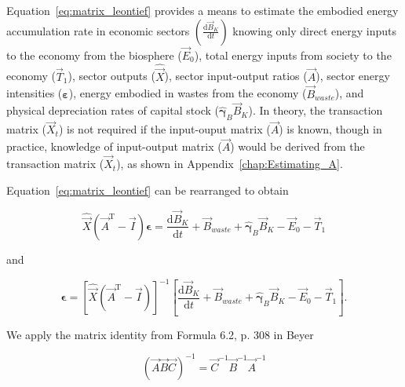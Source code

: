 Equation~\ref{eq:matrix_leontief} provides a means to 
estimate the embodied energy accumulation rate
in economic sectors $\left(\frac{\mathrm{d}\vec{B}_{K}}{\mathrm{d}t}\right)$ 
knowing only 
direct energy inputs to the economy from the biosphere ($\vec{E}_{0}$), 
total energy inputs from society to the economy ($\vec{T}_{1}$),
sector outputs ($\hat{\vec{X}}$), 
sector input-output ratios ($\vec{A}$), 
sector energy intensities ($\bm{\varepsilon}$), 
energy embodied in wastes from the economy ($\vec{B}_{waste}$),
and physical depreciation rates of capital stock ($\hat{\bm{\gamma}}_{B}\vec{B}_{K}$). 
In theory, the transaction matrix ($\vec{X}_{t}$) is not required 
if the input-ouput matrix ($\vec{A}$) is known, 
though in practice, 
knowledge of input-output matrix ($\vec{A}$) 
would be derived from the transaction matrix ($\vec{X}_{t}$),
as shown in Appendix~\ref{chap:Estimating_A}.



Equation~\ref{eq:matrix_leontief} can be rearranged to obtain

\begin{equation} \label{eq:epsilon_derivation_1}
	\hat{\vec{X}} (\vec{A}^{\mathrm{T}} - \vec{I}) \bm{\epsilon}
	= \frac{\mathrm{d}\vec{B}_{K}}{\mathrm{d}t}
	+ \vec{B}_{waste}
	+ \hat{\bm{\gamma}}_{B} \vec{B}_{K}
	- \vec{E}_{0}
	- \vec{T}_{1} 
\end{equation}

\noindent{}and

\begin{equation} \label{eq:epsilon_derivation_2}
	\bm{\epsilon}
	= {\left[ \hat{\vec{X}} (\vec{A}^{\mathrm{T}} - \vec{I}) \right]}^{-1}
		\left[
			\frac{\mathrm{d}\vec{B}_{K}}{\mathrm{d}t}
			+ \vec{B}_{waste}
			+ \hat{\bm{\gamma}}_{B} \vec{B}_{K}
			- \vec{E}_{0}
			- \vec{T}_{1} 
		\right].
\end{equation}

\noindent{}We apply the matrix identity 
from Formula 6.2, p. 308 in Beyer~\cite{Beyer:1991vd}

\begin{equation} \label{eq:matrix_identity_Beyer}
	{\left(\vec{A}\vec{B}\vec{C}\right)}^{-1} 
	= \vec{C}^{-1} \vec{B}^{-1} \vec{A}^{-1}
\end{equation}

